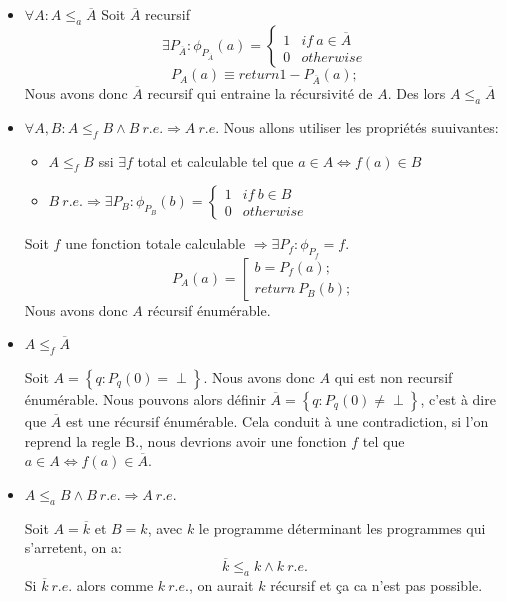 \subsection{}
\begin{itemize}
	\item[(a)] $\forall A: A\leq_a \overline{A}$
	Soit $\overline{A}$ recursif
	$$\exists P_{\overline{A}} : \phi_{P_{\overline{A}}}(a) = 
	\left\{
	\begin{array}{ll}
	1 & if\ a \in \overline{A} \\
	0 & otherwise
	\end{array}
	\right.
	$$
	$$P_A(a) \equiv return 1 - P_{\overline{A}}(a);$$
	Nous avons donc $\overline{A}$ recursif qui entraine la récursivité de $A$. Des lors
 $A\leq_a \overline{A}$
	\item[(b)] $\forall A,B: A \leq_f B \land B \ r.e. \Rightarrow A \ r.e.$
	Nous allons utiliser les propriétés suuivantes:
	\begin{itemize}
	\item $A \leq_f B$ ssi $\exists f$ total et calculable tel que $a \in A \Leftrightarrow f(a) \in B$
	\item $B \ r.e. \Rightarrow \exists P_B : \phi_{P_B}(b) = 
	\left\{
	\begin{array}{ll}
	1 & if \ b \in B \\
	0 & otherwise
	\end{array}
	\right.$
	\end{itemize}
	Soit $f$ une fonction totale calculable $\Rightarrow \exists P_f : \phi_{P_f} = f$.
	$$P_A(a)=\left[\begin{array}{l}b = P_f(a);\\ return\ P_B(b);\end{array}\right.$$
	Nous avons donc $A$ récursif énumérable.
	\item[(c)] $A \leq_f \overline{A}$
	
	Soit $A = \left\{q : P_q(0) = \perp\right\}$. Nous avons donc $A$ qui est non recursif énumérable. Nous pouvons alors définir $\overline{A} = \left\{q : P_q(0) \neq \perp\right\}$, c'est à dire que $\overline{A}$ est une récursif énumérable. Cela conduit à une contradiction, si l'on reprend la regle \textsc{B.}, nous devrions avoir une fonction $f$ tel que $a \in A \Leftrightarrow f(a) \in \overline{A}$.

	\item[(d)] $A \leq_a B \land B \ r.e. \Rightarrow A \ r.e.$

	Soit $A = \overline{k}$ et $B = k$, avec $k$ le programme déterminant les programmes qui s'arretent, on a:
	$$\overline{k} \leq_a k \land k \ r.e.$$
	Si $\overline{k} \ r.e.$ alors comme $k \ r.e.$, on aurait $k$ récursif et ça ca n'est pas possible.
\end{itemize}

